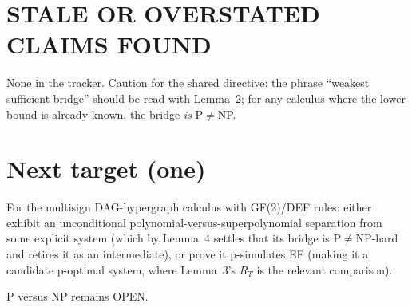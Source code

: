 \documentclass[11pt]{article}
\begin{document}
\section*{STALE OR OVERSTATED CLAIMS FOUND}
None in the tracker. Caution for the shared directive: the phrase ``weakest
sufficient bridge'' should be read with Lemma~2; for any calculus where the
lower bound is already known, the bridge \emph{is} P$\neq$NP.

\section*{Next target (one)}
For the multisign DAG-hypergraph calculus with GF(2)/DEF rules: either exhibit
an unconditional polynomial-versus-superpolynomial separation from some
explicit system (which by Lemma~4 settles that its bridge is P$\neq$NP-hard and
retires it as an intermediate), or prove it p-simulates EF (making it a
candidate p-optimal system, where Lemma~3's $R_T$ is the relevant comparison).

P versus NP remains OPEN.
\end{document}
